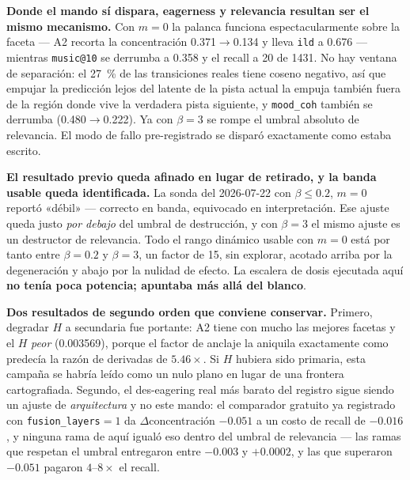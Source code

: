 \documentclass[11pt]{article}
\begin{document}
\textbf{Donde el mando sí dispara, eagerness y relevancia resultan ser el mismo
mecanismo.} Con $m=0$ la palanca funciona espectacularmente sobre la faceta --- A2
recorta la concentración \num{0.371}$\to$\num{0.134} y lleva \texttt{ild} a
\num{0.676} --- mientras \texttt{music@10} se derrumba a \num{0.358} y el recall a
\num{20} de \num{1431}. No hay ventana de separación: el \SI{27}{\percent} de las
transiciones reales tiene coseno negativo, así que empujar la predicción lejos del
latente de la pista actual la empuja también fuera de la región donde vive la
verdadera pista siguiente, y \texttt{mood\_coh} también se derrumba
(\num{0.480}$\to$\num{0.222}). Ya con $\beta=3$ se rompe el umbral absoluto de
relevancia. El modo de fallo pre-registrado se disparó exactamente como estaba
escrito.

\textbf{El resultado previo queda afinado en lugar de retirado, y la banda usable
queda identificada.} La sonda del 2026-07-22 con $\beta \le \num{0.2}$, $m=0$
reportó «débil» --- correcto en banda, equivocado en interpretación. Ese ajuste
queda justo \emph{por debajo} del umbral de destrucción, y con $\beta=3$ el mismo
ajuste es un destructor de relevancia. Todo el rango dinámico usable con $m=0$ está
por tanto entre $\beta=\num{0.2}$ y $\beta=\num{3}$, un factor de \num{15}, sin
explorar, acotado arriba por la degeneración y abajo por la nulidad de efecto. La
escalera de dosis ejecutada aquí \textbf{no tenía poca potencia; apuntaba más allá
del blanco}.

\textbf{Dos resultados de segundo orden que conviene conservar.} Primero, degradar
$H$ a secundaria fue portante: A2 tiene con mucho las mejores facetas y el $H$
\emph{peor} (\num{0.003569}), porque el factor de anclaje la aniquila exactamente
como predecía la razón de derivadas de $\num{5.46}\times$. Si $H$ hubiera sido
primaria, esta campaña se habría leído como un nulo plano en lugar de una frontera
cartografiada. Segundo, el des-eagering real más barato del registro sigue siendo un
ajuste de \emph{arquitectura} y no este mando: el comparador gratuito ya registrado
con \texttt{fusion\_layers}${}=1$ da $\Delta$concentración $-\num{0.051}$ a un
costo de recall de $-\num{0.016}$, y ninguna rama de aquí igualó eso dentro del
umbral de relevancia --- las ramas que respetan el umbral entregaron entre
$-\num{0.003}$ y $+\num{0.0002}$, y las que superaron $-\num{0.051}$ pagaron
$\numrange{4}{8}\times$ el recall.
\end{document}
